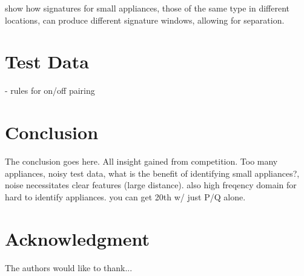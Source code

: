 \documentclass[conference]{IEEEtran}
\begin{document}
show how signatures for small appliances, those of the same type in different locations, can produce different signature windows, allowing for separation.

\section{Test Data}
- rules for on/off pairing

\section{Conclusion}
The conclusion goes here. All insight gained from competition. Too many appliances, noisy test data, what is the benefit of identifying small appliances?, noise necessitates clear features (large distance).  also high freqency domain for hard to identify appliances.  you can get 20th w/ just P/Q alone.   






\section*{Acknowledgment}


The authors would like to thank...







%
%
%

%
%

%






\end{document}
